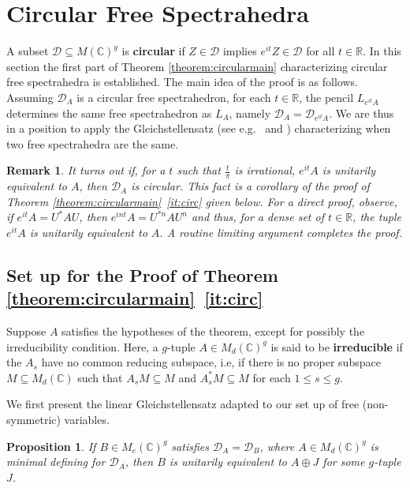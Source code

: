 \documentclass[12pt,makeidx]{amsart}
\renewcommand{\subset}{\subseteq}
\newtheorem{prop}[theorem]{Proposition}
\newtheorem{remark}[theorem]{Remark}
\numberwithin{equation}{section}
\def\cD{ {{\mathcal D}}}
\def\R{ {\mathbb{R}} }
\def\C{ {\mathbb{C}} }
\def\cD{ {\mathcal D} }
\newcommand{\df}[1]{{\bf{#1}}{\index{#1}}}
\begin{document}
\section{Circular Free Spectrahedra}\label{sec:circLMI}
 A subset $\cD \subset  M(\C)^g$ is \df{circular} if $Z \in \cD$ implies $e^{i t} Z \in \cD$ for all $t\in\R$.
 In this section the first part of Theorem \ref{theorem:circularmain} characterizing circular free spectrahedra is established. The main idea of the proof is as follows. 
 Assuming $\cD_A$ is a circular free spectrahedron, 
 for  each $t\in\R$, the pencil $L_{e^{it}A}$ determines the same free spectrahedron
  as  $L_A$, namely $\cD_{A}=\cD_{{e^{it}A}}$.  
We are thus in a position to apply the Gleichstellensatz
(see e.g.~\cite[Theorem 1.2]{HKM13} and \cite[Theorem 1.2]{Zal})
characterizing when two free spectrahedra are the same.

\begin{remark}\rm
 \label{rem:redundant}
   It turns out if, for a $t$ such that $\frac{t}{\pi}$ is irrational,  $e^{it} A$ is  unitarily equivalent to $A$, then $\cD_A$ is circular. This fact is a corollary of the proof of Theorem \ref{theorem:circularmain}~\ref{it:circ} given below. For a direct proof, observe, if $e^{it} A = U^* A U$, then $e^{int} A = U^{*n} A U^n$ and thus, for a dense set of $t \in \mathbb R$, the tuple $e^{it} A$ is unitarily equivalent to $A$. A routine limiting argument completes the proof. 
\end{remark}

\subsection{Set up for the Proof of Theorem \ref{theorem:circularmain}~\ref{it:circ}}

Suppose $A$ satisfies the hypotheses of the theorem, except for possibly the irreducibility condition. Here, a $g$-tuple $A \in M_d(\C)^g$ is said to be \df{irreducible} if the $A_s$ have no common reducing subspace, i.e, if there is no proper subspace $M \subseteq M_d(\C)$ such that $A_s M \subseteq M$ and $A_s^* M\subseteq M$  for each $1\le s\le g$. 

We first present  the linear Gleichstellensatz 
adapted to our set up  of  free (non-symmetric) variables.

\begin{prop}\label{prop:Gsatz}
If $B\in M_e(\C)^g$ satisfies $\cD_A=\cD_B$, where
 $A\in M_d(\C)^g$ is minimal defining for $\cD_A$,
then
$B$ is unitarily equivalent to $A\oplus J$ for some $g$-tuple $J$. 
\end{prop}
\end{document}
